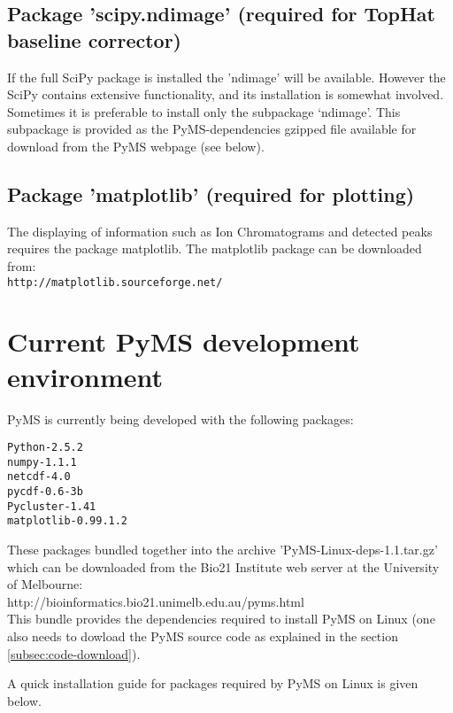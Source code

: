 \subsection{\label{subsec:scipy-ndmage}Package 'scipy.ndimage' (required
for TopHat baseline corrector)}

If the full SciPy package is installed the 'ndimage' will be available.
However the SciPy contains extensive functionality, and its installation
is somewhat involved. Sometimes it is preferable to install only the
subpackage `ndimage'. This subpackage is provided as the PyMS-dependencies
gzipped file available for download from the PyMS webpage (see below).

\subsection{\label{subsec:matplotlib}Package 'matplotlib' (required 
for plotting)}

The displaying of information such as Ion Chromatograms and detected
peaks requires the package matplotlib. The matplotlib package can be
downloaded from:\\
{\tt http://matplotlib.sourceforge.net/}

\section{Current PyMS development environment}

PyMS is currently being developed with the following packages:

\begin{verbatim}
Python-2.5.2
numpy-1.1.1
netcdf-4.0
pycdf-0.6-3b
Pycluster-1.41
matplotlib-0.99.1.2
\end{verbatim}

These packages bundled together into the archive 'PyMS-Linux-deps-1.1.tar.gz'
which can be downloaded from the Bio21 Institute web server at the
University of Melbourne:\\
http://bioinformatics.bio21.unimelb.edu.au/pyms.html\\
This bundle provides the dependencies required to install PyMS on Linux
(one also needs to dowload the PyMS source code as explained in the
section \ref{subsec:code-download}).

A quick installation guide for packages required by PyMS on Linux
is given below.

